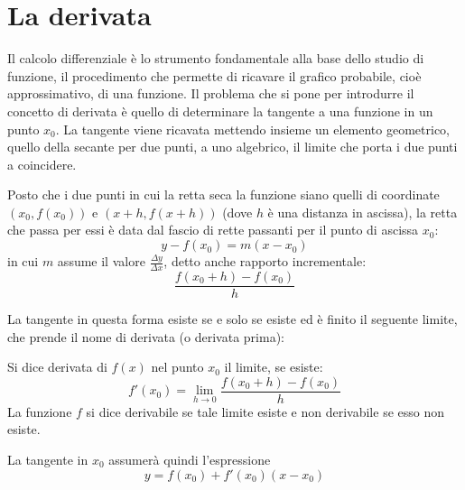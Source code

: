 %
%
%
%


\section{La derivata}
Il calcolo differenziale è lo strumento fondamentale alla base dello studio di funzione, il procedimento che permette di ricavare il grafico probabile, cioè approssimativo, di una funzione. Il problema che si pone per introdurre il concetto di derivata è quello di determinare la tangente a una funzione in un punto $x_0$. La tangente viene ricavata mettendo insieme un elemento geometrico, quello della secante per due punti, a uno algebrico, il limite che porta i due punti a coincidere.

Posto che i due punti in cui la retta seca la funzione siano quelli di coordinate $(x_0, f(x_0))$ e $(x+h, f(x+h))$ (dove $h$ è una distanza in ascissa), la retta che passa per essi è data dal fascio di rette passanti per il punto di ascissa $x_0$:
\begin{equation}
	\label{fasciof}
	y-f(x_0)=m(x-x_0)
\end{equation}
in cui $m$ assume il valore $\frac{\Delta y}{\Delta x}$, detto anche rapporto incrementale:
\[
	\frac{f(x_0+h)-f(x_0)}{h}
\]

La tangente in questa forma esiste se e solo se esiste ed è finito il seguente limite, che prende il nome di derivata (o derivata prima):
\begin{defin}[Derivata]
	Si dice derivata di $f(x)$ nel punto $x_0$ il limite, se esiste:
	\label{defin:deriv}
	\[
		f'(x_0)=\lim_{h\to0} \frac{f(x_0+h)-f(x_0)}{h}
	\]
	La funzione $f$ si dice derivabile se tale limite esiste e non derivabile se esso non esiste.
\end{defin}
La tangente in $x_0$ assumerà quindi l'espressione
\[
	y=f(x_0)+f'(x_0)(x-x_0)
\]

